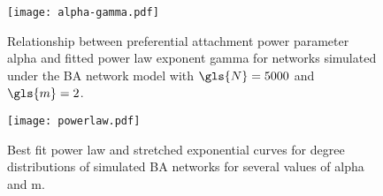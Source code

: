 \begin{figure}[ht]
    \centering
    \texttt{[image: alpha-gamma.pdf]}
    \caption{
        Relationship between preferential attachment power parameter
        \gls{alpha} and fitted power law exponent \gls{gamma} for networks
        simulated under the \gls{BA} network model with $\gls{N} = 5000$ and
        $\gls{m} = 2$.
    }
    \label{fig:gamma}
\end{figure}

\begin{figure}[ht]
    \centering
    \texttt{[image: powerlaw.pdf]}
    \caption{
        Best fit power law and stretched exponential curves for degree
        distributions of simulated \acrlong{BA} networks for several values of
        \gls{alpha} and \gls{m}.
    }
    \label{fig:powerlaw}
\end{figure}

